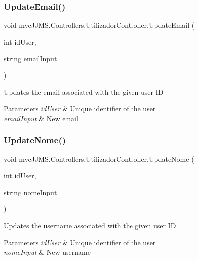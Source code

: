 \subsubsection{\texorpdfstring{Update\+Email()}{UpdateEmail()}}
{\footnotesize\ttfamily void mvc\+J\+J\+M\+S.\+Controllers.\+Utilizador\+Controller.\+Update\+Email (\begin{DoxyParamCaption}\item[{int}]{id\+User,  }\item[{string}]{email\+Input }\end{DoxyParamCaption})\hspace{0.3cm}{\ttfamily [inline]}}



Updates the email associated with the given user ID 


\begin{DoxyParams}{Parameters}
{\em id\+User} & Unique identifier of the user\\
\hline
{\em email\+Input} & New email\\
\hline
\end{DoxyParams}
\mbox{\label{classmvc_j_j_m_s_1_1_controllers_1_1_utilizador_controller_ae6ce52cd52288d470fb4d57da79dbffb}} 
\subsubsection{\texorpdfstring{Update\+Nome()}{UpdateNome()}}
{\footnotesize\ttfamily void mvc\+J\+J\+M\+S.\+Controllers.\+Utilizador\+Controller.\+Update\+Nome (\begin{DoxyParamCaption}\item[{int}]{id\+User,  }\item[{string}]{nome\+Input }\end{DoxyParamCaption})\hspace{0.3cm}{\ttfamily [inline]}}



Updates the username associated with the given user ID 


\begin{DoxyParams}{Parameters}
{\em id\+User} & Unique identifier of the user\\
\hline
{\em nome\+Input} & New username\\
\hline
\end{DoxyParams}
\mbox{\label{classmvc_j_j_m_s_1_1_controllers_1_1_utilizador_controller_a9dec9a63e5d6e07567c884db33e69ef3}} 
